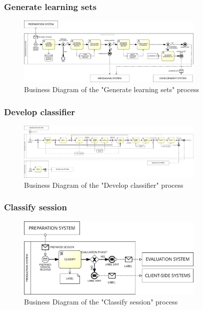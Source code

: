 \subsubsection{Generate learning sets}
\label{sec:bpmn_generate_learning_sets}

\begin{figure}[H]
\centering
\includegraphics[width=0.8\textwidth]{figures/Business Diagram - Generate Learning Sets.pdf}
\caption{Business Diagram of the "Generate learning sets" process}
\label{fig:bpmn_generate_learning_sets}
\end{figure}

\subsubsection{Develop classifier}
\label{sec:bpmn_develop_classifier}

\begin{figure}[H]
\centering
\includegraphics[width=0.8\textwidth]{figures/Business Diagram - Develop Classifier.pdf}
\caption{Business Diagram of the "Develop classifier" process}
\label{fig:bpmn_develop_classifier}
\end{figure}

\subsubsection{Classify session}
\label{sec:bpmn_classify_session}

\begin{figure}[H]
\centering
\includegraphics[width=0.8\textwidth]{figures/Business Diagram - Classify Session.pdf}
\caption{Business Diagram of the "Classify session" process}
\label{fig:bpmn_classify_session}
\end{figure}

